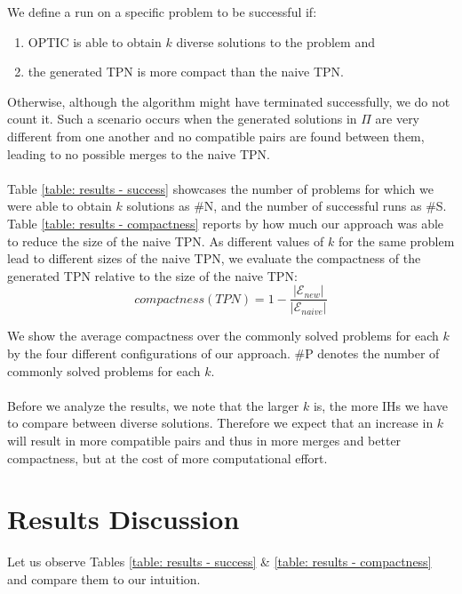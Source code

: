 We define a run on a specific problem to be successful if:
\begin{enumerate}[label=(\roman*)]
    \item OPTIC is able to obtain $k$
diverse solutions to the problem and
 \item the generated TPN is more compact than the naive TPN.
\end{enumerate}
Otherwise, although the algorithm might have terminated successfully, we do not count it.
Such a scenario occurs when the generated solutions in $\Pi$ are very different from one another 
and no compatible pairs are found between them, leading to no possible merges to the naive TPN.\\
\\
Table \ref{table: results - success} showcases the number of problems for which we were
able to obtain $k$ solutions as \#N, and the number of successful runs as \#S.
\\
Table \ref{table: results - compactness} reports by how much our approach was able to reduce the size 
of the naive TPN. As different values of $k$ for the same problem lead to different sizes of the naive TPN, 
we evaluate the compactness of the generated TPN relative to the size of the naive 
TPN: 
\[compactness(TPN) = 1 - \frac{|\mathcal{E}_{new}|}{|\mathcal{E}_{naive}|}\]

We show the average compactness over the commonly solved problems for each $k$ by the four different 
configurations of our approach. \#P denotes the number of commonly solved problems for each $k$.
\\ \\
Before we analyze the results, we note that the larger $k$ is, the more IHs we have to compare between diverse solutions.
Therefore we expect that an increase in $k$ will result in more compatible pairs and thus in more merges and better compactness, but at the cost of more computational effort. 

\section{Results Discussion}
Let us observe Tables \ref{table: results - success} \& \ref{table: results - compactness} and compare them to our intuition.

